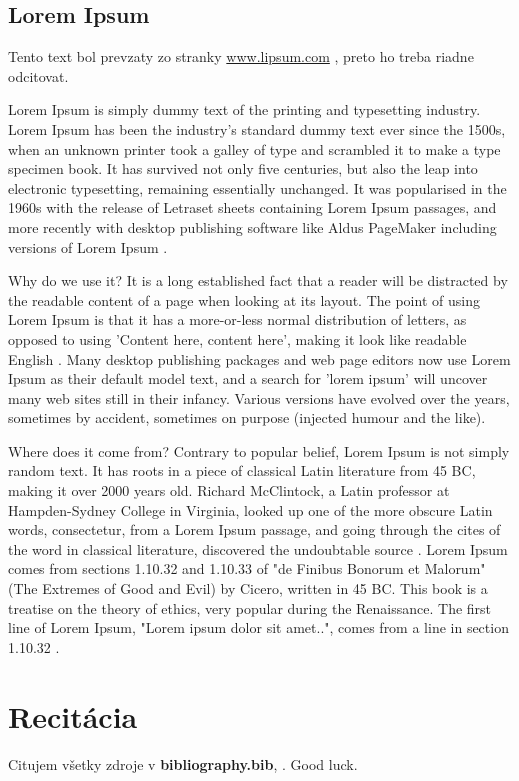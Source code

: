 \subsection{Lorem Ipsum}
Tento text bol prevzaty zo stranky \url{www.lipsum.com} \cite{lipsum}, preto ho treba riadne odcitovat.

Lorem Ipsum is simply dummy text of the printing and typesetting industry. Lorem Ipsum has been the industry's standard dummy text ever since the 1500s, when an unknown printer took a galley of type and scrambled it to make a type specimen book. It has survived not only five centuries, but also the leap into electronic typesetting, remaining essentially unchanged. It was popularised in the 1960s with the release of Letraset sheets containing Lorem Ipsum passages, and more recently with desktop publishing software like Aldus PageMaker including versions of Lorem Ipsum \cite{lipsum}.

Why do we use it? It is a long established fact that a reader will be distracted by the readable content of a page when looking at its layout. The point of using Lorem Ipsum is that it has a more-or-less normal distribution of letters, as opposed to using 'Content here, content here', making it look like readable English \cite{lipsum}. Many desktop publishing packages and web page editors now use Lorem Ipsum as their default model text, and a search for 'lorem ipsum' will uncover many web sites still in their infancy. Various versions have evolved over the years, sometimes by accident, sometimes on purpose (injected humour and the like).

Where does it come from? Contrary to popular belief, Lorem Ipsum is not simply random text. It has roots in a piece of classical Latin literature from 45 BC, making it over 2000 years old. Richard McClintock, a Latin professor at Hampden-Sydney College in Virginia, looked up one of the more obscure Latin words, consectetur, from a Lorem Ipsum passage, and going through the cites of the word in classical literature, discovered the undoubtable source \cite{lipsum}. Lorem Ipsum comes from sections 1.10.32 and 1.10.33 of "de Finibus Bonorum et Malorum" (The Extremes of Good and Evil) by Cicero, written in 45 BC. This book is a treatise on the theory of ethics, very popular during the Renaissance. The first line of Lorem Ipsum, "Lorem ipsum dolor sit amet..", comes from a line in section 1.10.32 \cite{lipsum}.

\section{Recitácia}
Citujem všetky zdroje v \textbf{bibliography.bib}, \cite{t00, t01, t02, t03, kniha, kniha2, kniha3, small, big, cs, koll, kap, tug, knuth, zbornik, prispevok}. \newline Good luck.

